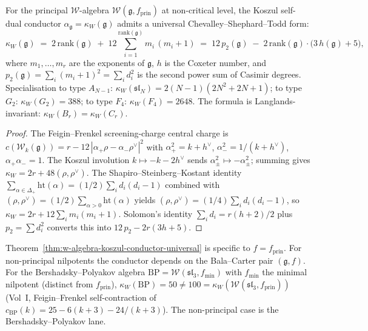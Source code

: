 \begin{theorem}
\label{thm:w-algebra-koszul-conductor-universal}
For the principal $\mathcal{W}$-algebra $\mathcal{W}(\mathfrak{g},
f_{\mathrm{prin}})$ at non-critical level, the Koszul self-dual
conductor $\alpha_{\mathfrak{g}} = \kappa_W(\mathfrak{g})$ admits a
universal Chevalley--Shephard--Todd form:
\[
 \kappa_W(\mathfrak{g})
 \;=\;
 2\,\mathrm{rank}(\mathfrak{g})
 \;+\;
 12 \sum_{i=1}^{\mathrm{rank}(\mathfrak{g})} m_i\,(m_i + 1)
 \;=\;
 12\,p_2(\mathfrak{g})
 \;-\;
 2\,\mathrm{rank}(\mathfrak{g})\cdot\bigl(3\,h(\mathfrak{g}) + 5\bigr),
\]
where $m_1, \ldots, m_r$ are the exponents of $\mathfrak{g}$, $h$ is
the Coxeter number, and $p_2(\mathfrak{g}) = \sum_i (m_i + 1)^2 =
\sum_i d_i^2$ is the second power sum of Casimir degrees.
Specialisation to type $A_{N-1}$:
$\kappa_W(\mathfrak{sl}_N) = 2(N-1)(2N^2 + 2N + 1)$; to type $G_2$:
$\kappa_W(G_2) = 388$; to type $F_4$: $\kappa_W(F_4) = 2648$. The
formula is Langlands-invariant: $\kappa_W(B_r) = \kappa_W(C_r)$.
\end{theorem}

\begin{proof}
The Feigin--Frenkel screening-charge central charge is $c(\mathcal{W}_k(\mathfrak{g})) = r - 12\,|\alpha_+\rho - \alpha_-\rho^\vee|^2$
with $\alpha_+^2 = k + h^\vee$, $\alpha_-^2 = 1/(k+h^\vee)$,
$\alpha_+\alpha_- = 1$. The Koszul involution
$k \mapsto -k - 2h^\vee$ sends $\alpha_\pm^2 \mapsto -\alpha_\pm^2$;
summing gives $\kappa_W = 2r + 48(\rho, \rho^\vee)$. The
Shapiro--Steinberg--Kostant identity
$\sum_{\alpha \in \Delta_+} \mathrm{ht}(\alpha) = (1/2) \sum_i d_i(d_i - 1)$
combined with $(\rho, \rho^\vee) = (1/2) \sum_{\alpha > 0}\mathrm{ht}(\alpha)$
yields $(\rho, \rho^\vee) = (1/4)\sum_i d_i(d_i - 1)$, so
$\kappa_W = 2r + 12\sum_i m_i(m_i + 1)$. Solomon's identity
$\sum_i d_i = r(h+2)/2$ plus $p_2 = \sum d_i^2$ converts this into
$12\,p_2 - 2r(3h+5)$.
\end{proof}

\begin{remark}
Theorem~\ref{thm:w-algebra-koszul-conductor-universal} is specific to
$f = f_{\mathrm{prin}}$. For non-principal nilpotents the conductor
depends on the Bala--Carter pair $(\mathfrak{g}, f)$. For the
Bershadsky--Polyakov algebra
$\mathrm{BP} = \mathcal{W}(\mathfrak{sl}_3, f_{\mathrm{min}})$ with
$f_{\mathrm{min}}$ the minimal nilpotent (distinct from
$f_{\mathrm{prin}}$), $\kappa_W(\mathrm{BP}) = 50 \ne 100 =
\kappa_W(\mathcal{W}(\mathfrak{sl}_3, f_{\mathrm{prin}}))$ (Vol~I,
Feigin--Frenkel self-contraction of
$c_{\mathrm{BP}}(k) = 25 - 6(k+3) - 24/(k+3)$). The
non-principal case is the Bershadsky--Polyakov lane.
\end{remark}

